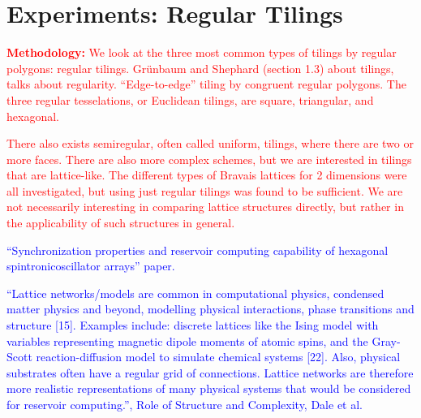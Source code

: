\chapter{Experiments: Regular Tilings}
\label{ch:regular-tilings}



\textcolor{red}{
  \textbf{Methodology:} We look at the three most common types of tilings by
regular polygons: regular tilings. Grünbaum and Shephard (section 1.3) about
tilings, talks about regularity. ``Edge-to-edge'' tiling by congruent regular
polygons. The three regular tesselations, or Euclidean tilings, are square,
triangular, and hexagonal.
}

\textcolor{red}{
  There also exists semiregular, often called uniform, tilings, where there are
two or more faces. There are also more complex schemes, but we are interested in
tilings that are lattice-like. The different types of Bravais lattices for 2
dimensions were all investigated, but using just regular tilings was found to be
sufficient. We are not necessarily interesting in comparing lattice structures
directly, but rather in the applicability of such structures in general.
}

\textcolor{blue}{
  ``Synchronization properties and reservoir computing capability of hexagonal
spintronicoscillator arrays'' paper.
}

\textcolor{blue}{
  ``Lattice networks/models are common in computational physics, condensed
matter physics and beyond, modelling physical interactions, phase transitions
and structure [15]. Examples include: discrete lattices like the Ising model
with variables representing magnetic dipole moments of atomic spins, and the
Gray- Scott reaction-diffusion model to simulate chemical systems [22]. Also,
physical substrates often have a regular grid of connections. Lattice networks
are therefore more realistic representations of many physical systems that would
be considered for reservoir computing.'', Role of Structure and Complexity, Dale
et al.
}


